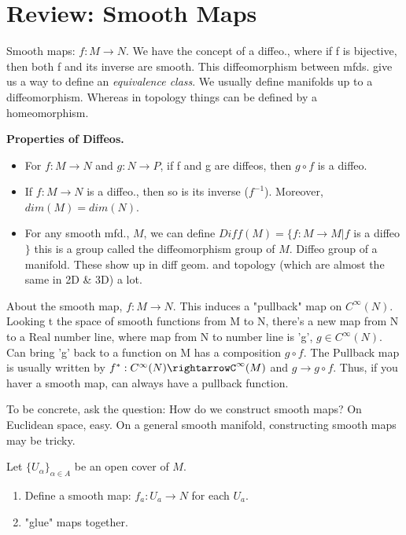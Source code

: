 \documentclass[12pt,letterpaper]{article}
\begin{document}
\section{Review: Smooth Maps}

Smooth maps: $f: M \rightarrow N$. We have the concept of a diffeo., where if f is bijective, then both f and its inverse are smooth. This diffeomorphism between mfds. give us a way to define an \textit{equivalence class}. We usually define manifolds up to a diffeomorphism. Whereas in topology things can be defined by a homeomorphism. 

\textbf{Properties of Diffeos.}
\begin{itemize}
    \item For $f: M \rightarrow N$ and $g: N \rightarrow P$, if f and g are diffeos, then $g \circ f $ is a diffeo.
    \item If $f: M \rightarrow N$ is a diffeo., then so is its inverse ($f^{-1}$). Moreover, $dim(M)=dim(N)$.
    \item For any smooth mfd., $M$, we can define $Diff(M)= \{ f:M \rightarrow M | f$ is a diffeo $\}$ this is a group called the diffeomorphism group of $M$. Diffeo group of a manifold. These show up in diff geom. and topology (which are almost the same in 2D & 3D) a lot.
\end{itemize}

About the smooth map, $f: M\rightarrow N$. This induces a "pullback" map on $C^{\infty}(N)$. Looking t the space of smooth functions from M to N, there's a new map from N to a Real number line, where map from N to number line is 'g', $g \in C^{\infty}(N)$. Can bring 'g' back to a function on M has a composition $g \circ f$. The Pullback map is usually written by $f^* : C^{\infty}(N) \rightarrowC^{\infty}(M)$ and $ g \rightarrow g \circ f$. Thus, if you haver a smooth map, can always have a pullback function. 
\newline

To be concrete, ask the question: How do we construct smooth maps? On Euclidean space, easy. On a general smooth manifold, constructing smooth maps may be tricky.

Let $\{U_{\alpha}\}_{\alpha \in A}$ be an open cover of $M$. 
\begin{enumerate}
    \item Define a smooth map: $f_a : U_a \rightarrow N$ for each $U_a$.
    \item "glue" maps together.
\end{enumerate}
\end{document}

